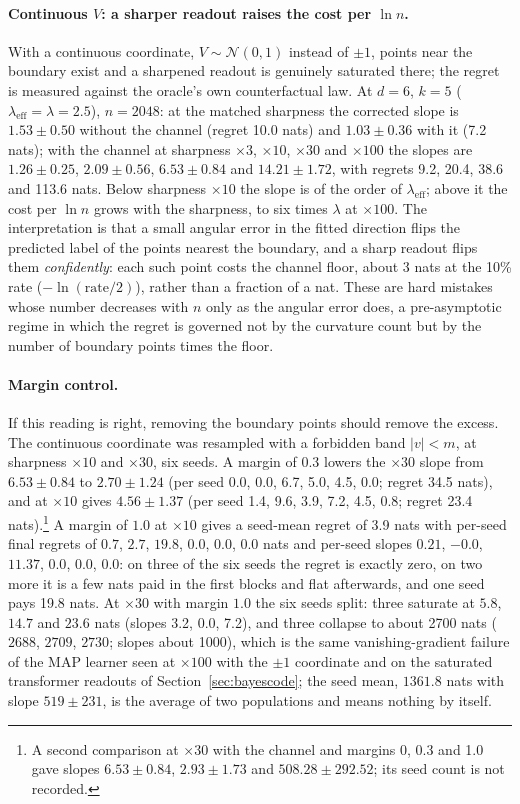 \documentclass[11pt,a4paper]{article}
\begin{document}
\paragraph{Continuous $V$: a sharper readout raises the cost per $\ln n$.} With a continuous coordinate, $V\sim\mathcal N(0,1)$ instead of $\pm1$, points near the boundary exist and a sharpened readout is genuinely saturated there; the regret is measured against the oracle's own counterfactual law. At $d=6$, $k=5$ ($\lambda_{\mathrm{eff}}=\lambda=2.5$), $n=2048$: at the matched sharpness the corrected slope is $1.53\pm0.50$ without the channel (regret 10.0 nats) and $1.03\pm0.36$ with it (7.2 nats); with the channel at sharpness $\times3$, $\times10$, $\times30$ and $\times100$ the slopes are $1.26\pm0.25$, $2.09\pm0.56$, $6.53\pm0.84$ and $14.21\pm1.72$, with regrets 9.2, 20.4, 38.6 and 113.6 nats. Below sharpness $\times10$ the slope is of the order of $\lambda_{\mathrm{eff}}$; above it the cost per $\ln n$ grows with the sharpness, to six times $\lambda$ at $\times100$. The interpretation is that a small angular error in the fitted direction flips the predicted label of the points nearest the boundary, and a sharp readout flips them \emph{confidently}: each such point costs the channel floor, about 3 nats at the 10\% rate ($-\ln(\mathrm{rate}/2)$), rather than a fraction of a nat. These are hard mistakes whose number decreases with $n$ only as the angular error does, a pre-asymptotic regime in which the regret is governed not by the curvature count but by the number of boundary points times the floor.

\paragraph{Margin control.} If this reading is right, removing the boundary points should remove the excess. The continuous coordinate was resampled with a forbidden band $|v|<m$, at sharpness $\times10$ and $\times30$, six seeds. A margin of $0.3$ lowers the $\times30$ slope from $6.53\pm0.84$ to $2.70\pm1.24$ (per seed 0.0, 0.0, 6.7, 5.0, 4.5, 0.0; regret 34.5 nats), and at $\times10$ gives $4.56\pm1.37$ (per seed 1.4, 9.6, 3.9, 7.2, 4.5, 0.8; regret 23.4 nats).\footnote{A second comparison at $\times30$ with the channel and margins 0, 0.3 and 1.0 gave slopes $6.53\pm0.84$, $2.93\pm1.73$ and $508.28\pm292.52$; its seed count is not recorded.} A margin of $1.0$ at $\times10$ gives a seed-mean regret of 3.9 nats with per-seed final regrets of $0.7$, $2.7$, $19.8$, $0.0$, $0.0$, $0.0$ nats and per-seed slopes $0.21$, $-0.0$, $11.37$, $0.0$, $0.0$, $0.0$: on three of the six seeds the regret is exactly zero, on two more it is a few nats paid in the first blocks and flat afterwards, and one seed pays 19.8 nats. At $\times30$ with margin $1.0$ the six seeds split: three saturate at $5.8$, $14.7$ and $23.6$ nats (slopes 3.2, 0.0, 7.2), and three collapse to about 2700 nats ($2688$, $2709$, $2730$; slopes about 1000), which is the same vanishing-gradient failure of the MAP learner seen at $\times100$ with the $\pm1$ coordinate and on the saturated transformer readouts of Section~\ref{sec:bayescode}; the seed mean, $1361.8$ nats with slope $519\pm231$, is the average of two populations and means nothing by itself.
\end{document}
